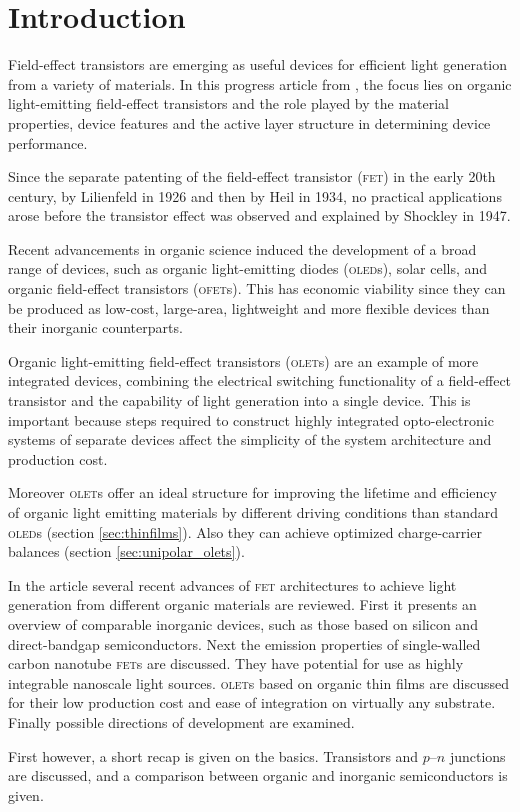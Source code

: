 \section{Introduction}
Field-effect transistors are emerging as useful devices for efficient light generation from a variety of materials. In this progress article from \citet{Muccini}, the focus lies on organic light-emitting field-effect transistors and the role played by the material properties, device features and the active layer structure in determining device performance.

Since the separate patenting of the field-effect transistor (\textsc{fet}) in the early 20th century, by Lilienfeld in 1926 and then by Heil in 1934, no practical applications arose before the transistor effect was observed and explained by Shockley in 1947.

Recent advancements in organic science induced the development of a broad range of devices, such as organic light-emitting diodes (\textsc{oled}s), solar cells, and organic field-effect transistors (\textsc{ofet}s). This has economic viability since they can be produced as low-cost, large-area, lightweight and more flexible devices than their inorganic counterparts.

Organic light-emitting field-effect transistors (\textsc{olet}s) are an example of more integrated devices, combining the electrical switching functionality of a field-effect transistor and the capability of light generation into a single device. This is important because steps required to construct highly integrated opto-electronic systems of separate devices affect the simplicity of the system architecture and production cost.

Moreover \textsc{olet}s offer an ideal structure for improving the lifetime and efficiency of organic light emitting materials by different driving conditions than standard \textsc{oled}s (section \ref{sec:thinfilms}). Also they can achieve optimized charge-carrier balances (section \ref{sec:unipolar_olets}).

In the article several recent advances of \textsc{fet} architectures to achieve light generation from different organic materials are reviewed. First it presents an overview of comparable inorganic devices, such as those based on silicon and direct-bandgap semiconductors. Next the emission properties of single-walled carbon nanotube \textsc{fet}s are discussed. They have potential for use as highly integrable nanoscale light sources. \textsc{olet}s based on organic thin films are discussed for their low production cost and ease of integration on virtually any substrate. Finally possible directions of development are examined.

First however, a short recap is given on the basics. Transistors and $p$--$n$ junctions are discussed, and a comparison between organic and inorganic semiconductors is given.